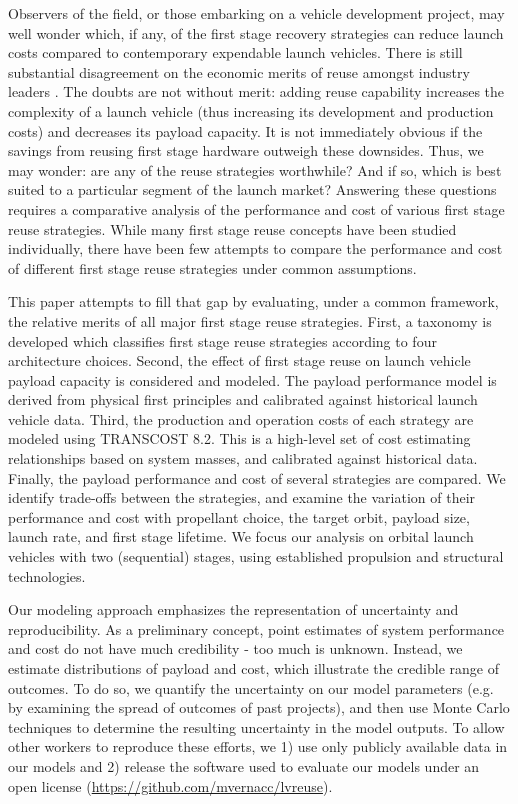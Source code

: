 \documentclass[conf]{new-aiaa}
\begin{document}
\begin{multicols}{2}
Observers of the field, or those embarking on a vehicle development project, may well wonder which, if any, of the first stage recovery strategies can reduce launch costs compared to contemporary expendable launch vehicles. There is still substantial disagreement on the economic merits of reuse amongst industry leaders \cite{Cantrell17, Russell18, Selding16_orbital, Wall15, Selding16_spacex}. The doubts are not without merit: adding reuse capability increases the complexity of a launch vehicle (thus increasing its development and production costs) and decreases its payload capacity. It is not immediately obvious if the savings from reusing first stage hardware outweigh these downsides. Thus, we may wonder: are any of the reuse strategies worthwhile? And if so, which is best suited to a particular segment of the launch market? Answering these questions requires a comparative analysis of the performance and cost of various first stage reuse strategies. While many first stage reuse concepts have been studied individually, there have been few attempts to compare the performance and cost of different first stage reuse strategies under common assumptions.

This paper attempts to fill that gap by evaluating, under a common framework, the relative merits of all major first stage reuse strategies. First, a taxonomy is developed which classifies first stage reuse strategies according to four architecture choices. Second, the effect of first stage reuse on launch vehicle payload capacity is considered and modeled. The payload performance model is derived from physical first principles and calibrated against historical launch vehicle data. Third, the production and operation costs of each strategy are modeled using TRANSCOST 8.2. This is a high-level set of cost estimating relationships based on system masses, and calibrated against historical data. Finally, the payload performance and cost of several strategies are compared. We identify trade-offs between the strategies, and examine the variation of their performance and cost with propellant choice, the target orbit, payload size, launch rate, and first stage lifetime. We focus our analysis on orbital launch vehicles with two (sequential) stages, using established propulsion and structural technologies.

Our modeling approach emphasizes the representation of uncertainty and reproducibility. As a preliminary concept, point estimates of system performance and cost do not have much credibility - too much is unknown. Instead, we estimate distributions of payload and cost, which illustrate the credible range of outcomes. To do so, we quantify the uncertainty on our model parameters (e.g. by examining the spread of outcomes of past projects), and then use Monte Carlo techniques to determine the resulting uncertainty in the model outputs. To allow other workers to reproduce these efforts, we 1) use only publicly available data in our models and 2) release the software used to evaluate our models under an open license (\url{https://github.com/mvernacc/lvreuse}).


\end{multicols}
\end{document}
